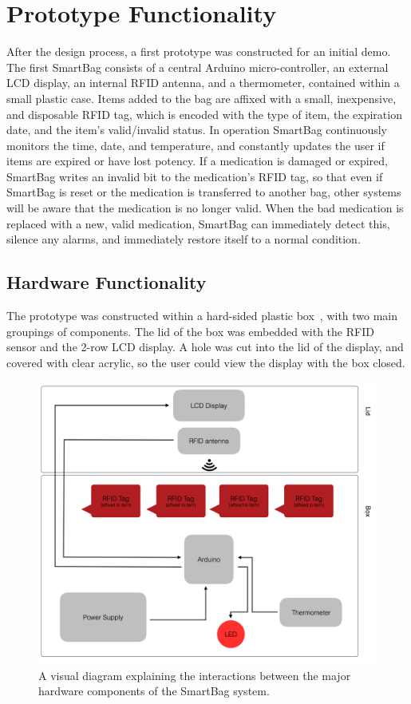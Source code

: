 \documentclass{sigchi}
\begin{document}
\section{Prototype Functionality} \label{functionality}
After the design process, a first prototype was constructed for an initial demo.
The first SmartBag consists of a central Arduino micro-controller, an external
LCD display, an internal RFID antenna, and a thermometer, contained within a
small plastic case. Items added to the bag are affixed with a small, inexpensive,
and disposable RFID tag, which is encoded with the type of item, the expiration
date, and the item’s valid/invalid status. In operation SmartBag continuously
monitors the time, date, and temperature, and constantly updates the user if
items are expired or have lost potency. If a medication is damaged or expired,
SmartBag writes an invalid bit to the medication's RFID tag, so that even if
SmartBag is reset or the medication is transferred to another bag, other systems
will be aware that the medication is no longer valid. When the bad medication is
replaced with  a new, valid medication, SmartBag can immediately detect this,
silence any alarms, and immediately restore itself to a normal condition.


\subsection{Hardware Functionality} \label{hardware}
The prototype was constructed within a hard-sided plastic box~\cite{pelicase},
with two main groupings of components. The lid of the box was embedded with the
RFID~\cite{rfid_breakout} sensor and the 2-row LCD display. A hole was cut into
the lid of the display, and covered with clear acrylic, so the user could view
the display with the box closed.

\begin{figure}[!ht]
\centering
\includegraphics[width=\columnwidth]{system_diagram}
\caption{A visual diagram explaining the interactions between the major
	hardware components of the SmartBag system.}
\label{fig:hardware_diagram}
\end{figure}
\end{document}
